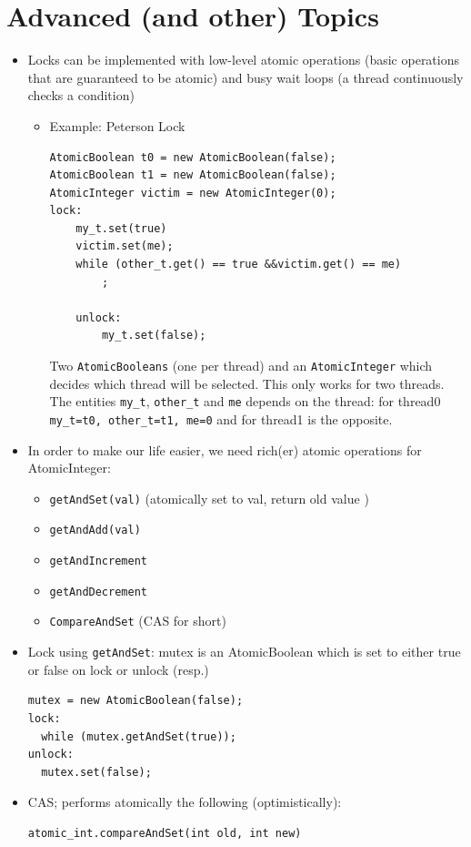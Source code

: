 \documentclass[a4paper]{article}
\newcommand{\inline}[1]{\lstinline!#1!}%
\begin{document}
\section{Advanced (and other) Topics}
\begin{itemize}
\item Locks can be implemented with low-level atomic operations (basic operations that are guaranteed to be atomic) and busy wait loops (a thread continuously checks a condition)
\begin{itemize}
\item Example: Peterson Lock
\begin{lstlisting}
AtomicBoolean t0 = new AtomicBoolean(false);
AtomicBoolean t1 = new AtomicBoolean(false);
AtomicInteger victim = new AtomicInteger(0);
lock:
    my_t.set(true)
    victim.set(me);
    while (other_t.get() == true &&victim.get() == me)
        ;
	
	unlock:
        my_t.set(false);
\end{lstlisting}
Two \inline{AtomicBooleans} (one per thread) and an \inline{AtomicInteger} which decides which thread will be selected. This only works for two threads. The entities \inline{my_t}, \inline{other_t} and \inline{me} depends on the thread: for thread0 \inline{my_t=t0, other_t=t1, me=0} and for thread1 is the opposite.
\end{itemize}
\item In order to make our life easier, we need rich(er) atomic operations for AtomicInteger: 
\begin{itemize}
\item \inline{getAndSet(val)} (atomically { set to val, return old value })
\item \inline{getAndAdd(val)}
\item \inline{getAndIncrement}
\item \inline{getAndDecrement}
\item \inline{CompareAndSet} (CAS for short)
\end{itemize}
\item Lock using \inline{getAndSet}: mutex is an AtomicBoolean which is set to either true or false on lock or unlock (resp.)
\begin{lstlisting}
mutex = new AtomicBoolean(false);
lock:
  while (mutex.getAndSet(true));
unlock:
  mutex.set(false);
\end{lstlisting}
\item CAS; performs atomically the following (optimistically): 
\begin{lstlisting}
atomic_int.compareAndSet(int old, int new)


\end{lstlisting}
\end{itemize}
\end{document}
